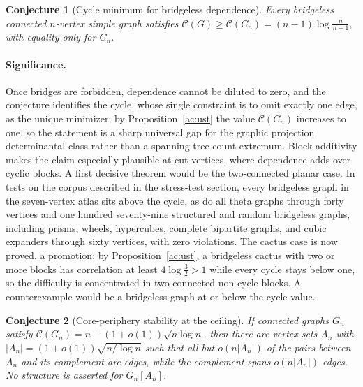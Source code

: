 \documentclass[11pt]{article}
\newtheorem{conjecture}{Conjecture}
\theoremstyle{definition}
\begin{document}
\begin{conjecture}[Cycle minimum for bridgeless dependence]\label{ac8}
Every bridgeless connected $n$-vertex simple graph satisfies $\mathcal C(G)\ge\mathcal C(C_n)=(n-1)\log\frac n{n-1}$, with equality only for $C_n$.
\end{conjecture}

\paragraph{Significance.}
Once bridges are forbidden, dependence cannot be diluted to zero, and the conjecture identifies the cycle, whose single constraint is to omit exactly one edge, as the unique minimizer; by Proposition~\ref{ac:ust} the value $\mathcal C(C_n)$ increases to one, so the statement is a sharp universal gap for the graphic projection determinantal class rather than a spanning-tree count extremum.  Block additivity makes the claim especially plausible at cut vertices, where dependence adds over cyclic blocks.  A first decisive theorem would be the two-connected planar case.  In tests on the corpus described in the stress-test section, every bridgeless graph in the seven-vertex atlas sits above the cycle, as do all theta graphs through forty vertices and one hundred seventy-nine structured and random bridgeless graphs, including prisms, wheels, hypercubes, complete bipartite graphs, and cubic expanders through sixty vertices, with zero violations.  The cactus case is now proved, a promotion: by Proposition~\ref{ac:ust}, a bridgeless cactus with two or more blocks has correlation at least $4\log\frac32>1$ while every cycle stays below one, so the difficulty is concentrated in two-connected non-cycle blocks.  A counterexample would be a bridgeless graph at or below the cycle value.

\begin{conjecture}[Core-periphery stability at the ceiling]\label{ac9}
If connected graphs $G_n$ satisfy $\mathcal C(G_n)=n-(1+o(1))\sqrt{n\log n}$, then there are vertex sets $A_n$ with $|A_n|=(1+o(1))\sqrt{n/\log n}$ such that all but $o(n|A_n|)$ of the pairs between $A_n$ and its complement are edges, while the complement spans $o(n|A_n|)$ edges.  No structure is asserted for $G_n[A_n]$.
\end{conjecture}
\end{document}
